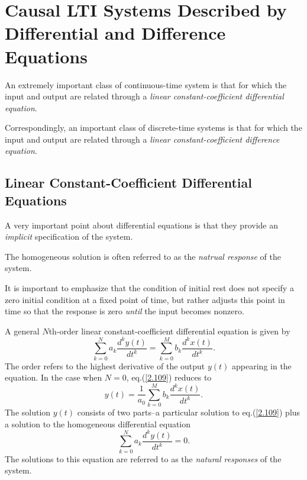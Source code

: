 \documentclass[a4paper,10pt,twoside]{book}
\begin{document}
\section{Causal LTI Systems Described by Differential and Difference Equations}

An extremely important class of continuous-time system is that for which the input and output are related through a \textit{linear constant-coefficient differential equation}.

Correspondingly, an important class of discrete-time systems is that for which the input and output are related through a \textit{linear constant-coefficient difference equation}.

\subsection{Linear Constant-Coefficient Differential Equations}

A very important point about differential equations is that they provide an \textit{implicit} specification of the system.

The homogeneous solution is often referred to as the \textit{natrual response} of the system.

It is important to emphasize that the condition of initial rest does not specify a zero initial condition at a fixed point of time, but rather adjusts this point in time so that the response is zero \textit{until} the input becomes nonzero.

A general $N$th-order linear constant-coefficient differential equation is given by
\begin{equation}
    \sum_{k=0}^Na_k\frac{d^ky(t)}{dt^k}=\sum_{k=0}^Mb_k\frac{d^kx(t)}{dt^k}.
    \label{2.109}
\end{equation}
The order refers to the highest derivative of the output $y(t)$ appearing in the equation. In the case when $N=0$, eq.\;(\ref{2.109}) reduces to
\begin{equation}
    y(t) = \frac{1}{a_0}\sum_{k=0}^Mb_k\frac{d^kx(t)}{dt^k}.
    \label{2.110}
\end{equation}
The solution $y(t)$ consists of two parts--a particular solution to eq.\;(\ref{2.109}) plus a solution to the homogeneous differential equation
\begin{equation}
    \sum_{k=0}^Na_k\frac{d^ky(t)}{dt^k}=0.
    \label{2.111}
\end{equation}
The solutions to this equation are referred to as the \textit{natural responses} of the system.
\end{document}
